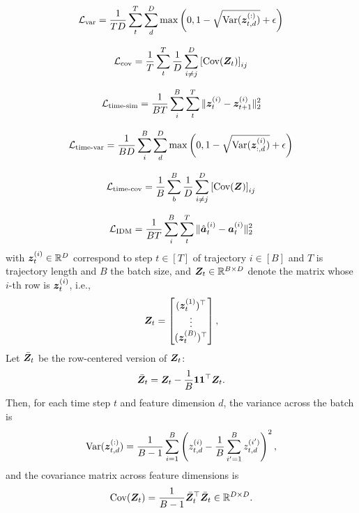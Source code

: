 \begin{equation*}
    \mathcal{L}_{\text{var}} =  \frac{1}{TD} \sum_t^T \sum_d^D \max\left(0,  1-\sqrt{\text{Var}({\bm{z}}^{(:)}_{t,d})}+\epsilon\right)
\end{equation*}

\begin{equation*}
    \mathcal{L}_{\text{cov}} =  \frac{1}{T} \sum_t^T \frac{1}{D}\sum_{i\neq j}^D \left[\text{Cov}({\bm{Z}}_t)\right]_{ij}
\end{equation*}

\begin{equation*}
    \mathcal{L}_{\text{time-sim}} = \frac{1}{BT} \sum_i^B \sum_t^T \| {\bm{z}}^{(i)}_t - {\bm{z}}^{(i)}_{t+1}\|_2^2
\end{equation*}

\begin{equation*}
    \mathcal{L}_{\text{time-var}} =  \frac{1}{BD} \sum_i^B \sum_d^D \max\left(0,  1-\sqrt{\text{Var}({\bm{z}}^{(i)}_{:,d})}+\epsilon\right)
\end{equation*}

\begin{equation*}
    \mathcal{L}_{\text{time-cov}} =  \frac{1}{B} \sum_b^B \frac{1}{D}\sum_{i\neq j}^D \left[\text{Cov}({\bm{Z}})\right]_{ij}
\end{equation*}

\begin{equation*}
    \mathcal{L}_{\text{IDM}} = \frac{1}{BT} \sum_i^B \sum_t^T \| \hat{{\bm{a}}}^{(i)}_t - {\bm{a}}^{(i)}_t\|_2^2
\end{equation*}
with ${\bm{z}}^{(i)}_{t} \in \mathbb{R}^{D}$ correspond to step $t \in [T]$ of trajectory $i \in [B]$ and $T$ is trajectory length and $B$ the batch size, and ${\bm{Z}}_t \in \mathbb{R}^{B \times D}$ denote the matrix whose $i$-th row is ${\bm{z}}_t^{(i)}$, i.e.,
\[
{\bm{Z}}_t =
\begin{bmatrix}
({\bm{z}}_t^{(1)})^\top \\
\vdots \\
({\bm{z}}_t^{(B)})^\top
\end{bmatrix},
\]
Let $\bar{{\bm{Z}}}_t$ be the row-centered version of ${\bm{Z}}_t$:
\[
\bar{{\bm{Z}}}_t = {\bm{Z}}_t - \frac{1}{B}\mathbf{1}\mathbf{1}^\top {\bm{Z}}_t .
\]
Then, for each time step $t$ and feature dimension $d$, the variance across the batch is
\[
\mathrm{Var}({\bm{z}}^{(:)}_{t,d})
=
\frac{1}{B-1}\sum_{i=1}^B
\left(
z^{(i)}_{t,d} - \frac{1}{B}\sum_{i'=1}^B z^{(i')}_{t,d}
\right)^2 ,
\]
and the covariance matrix across feature dimensions is
\[
\mathrm{Cov}({\bm{Z}}_t)
=
\frac{1}{B-1}\bar{{\bm{Z}}}_t^\top \bar{{\bm{Z}}}_t
\in \mathbb{R}^{D \times D}.
\]

